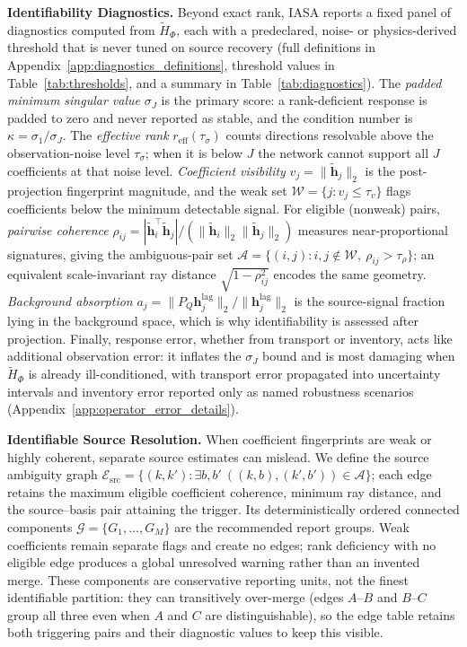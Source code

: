 \noindent\textbf{Identifiability Diagnostics.}
Beyond exact rank, IASA reports a fixed panel of diagnostics computed from
\(\widetilde H_\Phi\), each with a predeclared, noise- or physics-derived
threshold that is never tuned on source recovery (full definitions in
Appendix~\ref{app:diagnostics_definitions}, threshold values in
Table~\ref{tab:thresholds}, and a summary in Table~\ref{tab:diagnostics}).  The
\emph{padded minimum singular value} \(\sigma_J\) is the primary score: a
rank-deficient response is padded to zero and never reported as stable, and the
condition number is \(\kappa=\sigma_1/\sigma_J\).  The \emph{effective rank}
\(r_{\mathrm{eff}}(\tau_\sigma)\) counts directions resolvable above the
observation-noise level \(\tau_\sigma\); when it is below \(J\) the network
cannot support all \(J\) coefficients at that noise level.  \emph{Coefficient
visibility} \(v_j=\|\widetilde{\mathbf h}_j\|_2\) is the post-projection
fingerprint magnitude, and the weak set \(\mathcal W=\{j:v_j\le\tau_v\}\) flags
coefficients below the minimum detectable signal.  For eligible (nonweak) pairs,
\emph{pairwise coherence}
\(\rho_{ij}=|\widetilde{\mathbf h}_i^\top\widetilde{\mathbf h}_j|/
(\|\widetilde{\mathbf h}_i\|_2\|\widetilde{\mathbf h}_j\|_2)\) measures
near-proportional signatures, giving the ambiguous-pair set
\(\mathcal A=\{(i,j):i,j\notin\mathcal W,\ \rho_{ij}>\tau_\rho\}\); an equivalent
scale-invariant ray distance \(\sqrt{1-\rho_{ij}^2}\) encodes the same geometry.
\emph{Background absorption}
\(a_j=\|P_Q\mathbf h_j^{\mathrm{lag}}\|_2/\|\mathbf h_j^{\mathrm{lag}}\|_2\) is the
source-signal fraction lying in the background space, which is why
identifiability is assessed after projection.  Finally, response error, whether
from transport or inventory, acts like additional observation error: it inflates
the \(\sigma_J\) bound and is most damaging when \(\widetilde H_\Phi\) is already
ill-conditioned, with transport error propagated into uncertainty intervals and
inventory error reported only as named robustness scenarios
(Appendix~\ref{app:operator_error_details}).

\noindent\textbf{Identifiable Source Resolution.}
When coefficient fingerprints are weak or highly coherent, separate source
estimates can mislead.  We define the source ambiguity graph
\(\mathcal E_{\mathrm{src}}
=\{(k,k'):\exists b,b'\ ((k,b),(k',b'))\in\mathcal A\}\); each edge retains the
maximum eligible coefficient coherence, minimum ray distance, and the
source--basis pair attaining the trigger.  Its deterministically ordered
connected components \(\mathcal G=\{G_1,\ldots,G_M\}\) are the recommended report
groups.  Weak coefficients remain separate flags and create no edges; rank
deficiency with no eligible edge produces a global unresolved warning rather than
an invented merge.  These components are conservative reporting units, not the
finest identifiable partition: they can transitively over-merge (edges \(A\)--\(B\)
and \(B\)--\(C\) group all three even when \(A\) and \(C\) are distinguishable),
so the edge table retains both triggering pairs and their diagnostic values to
keep this visible.

